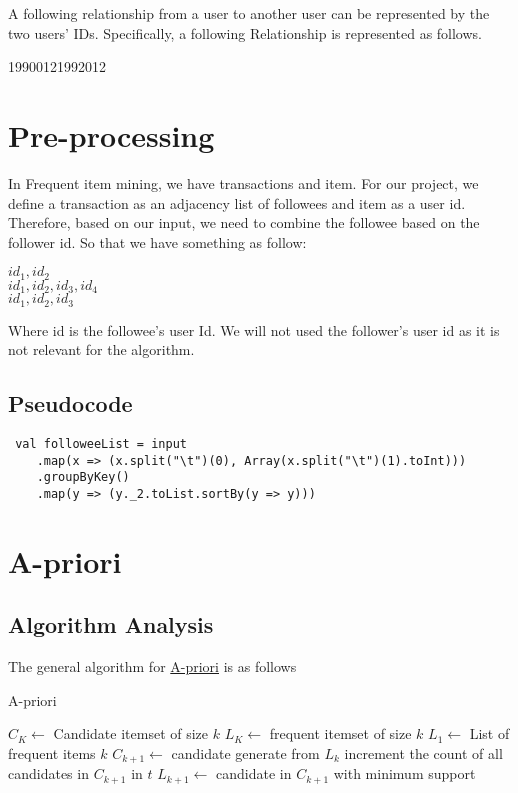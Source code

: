 \documentclass[11pt]{article}
\begin{document}
A following relationship from a user to another user can be represented by the two users' IDs.
Specifically, a following Relationship is represented as follows.

1990012\hspace{1cm}1992012

\section{Pre-processing}
In Frequent item mining, we have transactions and item.
For our project, we define a transaction as an adjacency list of followees and item as a user id.
Therefore, based on our input, we need to combine the followee based on the follower id.
So that we have something as follow: 

$id_1, id_2$ \\
$id_1, id_2, id_3, id_4$ \\
$id_1, id_2, id_3$

Where id is the followee's user Id.
We will not used the follower's user id as it is not relevant for the algorithm.

\subsection{Pseudocode}

\begin{lstlisting}
 val followeeList = input
    .map(x => (x.split("\t")(0), Array(x.split("\t")(1).toInt)))
    .groupByKey()
    .map(y => (y._2.toList.sortBy(y => y)))
\end{lstlisting}

\section{A-priori}

\subsection {Algorithm Analysis}
The general algorithm for \href{https://www3.cs.stonybrook.edu/~cse634/lecture_notes/07apriori.pdf}{A-priori} is as follows\\
\begin{algorithm}[H]
    \caption{A-priori}

    \begin{algorithmic}[1]
        \State $C_K \gets $ Candidate itemset of size $k$
        \State $L_K \gets $ frequent itemset of size $k$
        \State
        \State $L_1 \gets $ List of frequent items $k$
        \State
            \State $C_{k+1} \gets $ candidate generate from $L_k$
                \State increment the count of all candidates in $C_{k+1}$ in $t$
            \EndFor
            \State $L_{k+1} \gets$ candidate in $C_{k+1}$ with minimum support
        \EndFor
    \end{algorithmic}
\end{algorithm}
\end{document}
